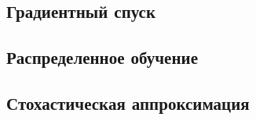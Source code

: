 

\subsection{Градиентный спуск}



\subsection{Распределенное обучение}



\subsection{Стохастическая аппроксимация}

